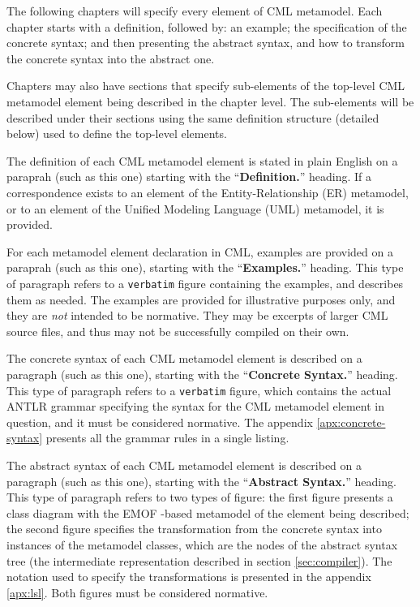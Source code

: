 The following chapters will specify every element of CML metamodel.
Each chapter starts with a definition, followed by: an example;
the specification of the concrete syntax;
and then presenting the abstract syntax,
and how to transform the concrete syntax into the abstract one.

Chapters may also have sections that specify sub-elements
of the top-level CML metamodel element being described in the chapter level.
The sub-elements will be described under their sections
using the same definition structure (detailed below)
used to define the top-level elements.

\begin{definition}
The definition of each CML metamodel element is stated in plain English
on a paraprah (such as this one)
starting with the ``\textbf{Definition.}'' heading.
If a correspondence exists to an element of
the Entity-Relationship (ER) \cite{er} metamodel,
or to an element of the Unified Modeling Language (UML) \cite{uml} metamodel,
it is provided.
\end{definition}

\begin{examples}
For each metamodel element declaration in CML,
examples are provided on a paraprah (such as this one),
starting with the ``\textbf{Examples.}'' heading.
This type of paragraph refers to a \verb+verbatim+ figure
containing the examples, and describes them as needed.
The examples are provided for illustrative purposes only,
and they are \emph{not} intended to be normative.
They may be excerpts of larger CML source files,
and thus may not be successfully compiled on their own.
\end{examples}

\begin{concrete-syntax}
The concrete syntax of each CML metamodel element is described
on a paragraph (such as this one),
starting with the ``\textbf{Concrete Syntax.}'' heading.
This type of paragraph refers to a \verb+verbatim+ figure,
which contains the actual ANTLR \cite{antlr} grammar
specifying the syntax for the CML metamodel element in question,
and it must be considered normative.
The appendix \ref{apx:concrete-syntax} presents all the grammar rules
in a single listing.
\end{concrete-syntax}

\begin{abstract-syntax}
The abstract syntax of each CML metamodel element is described
on a paragraph (such as this one),
starting with the ``\textbf{Abstract Syntax.}'' heading.
This type of paragraph refers to two types of figure:
the first figure presents a class diagram
with the EMOF \cite{mof}-based metamodel
of the element being described;
the second figure specifies the transformation
from the concrete syntax into instances of the metamodel classes,
which are the nodes of the abstract syntax tree
(the intermediate representation described in section \ref{sec:compiler}).
The notation used to specify the transformations is presented
in the appendix \ref{apx:lsl}.
Both figures must be considered normative.
\end{abstract-syntax}


